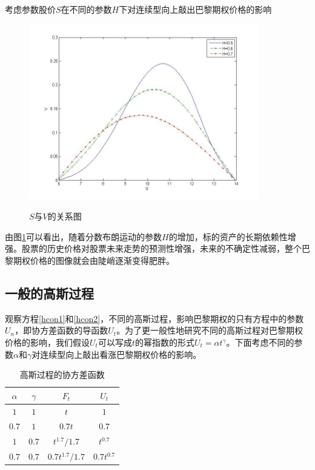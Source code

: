 \documentclass{ctexart} %
\begin{document}
考虑参数股价$S$在不同的参数$H$下对连续型向上敲出巴黎期权价格的影响
\begin{figure}[H]
\begin{center}
\label{paris_fbm}
\includegraphics[width=10cm]{code/paris_fbm.jpg}
\caption{$S$与$V$的关系图}
\end{center}
\end{figure}
由图\ref{paris_fbm}可以看出，随着分数布朗运动的参数$H$的增加，标的资产的长期依赖性增强。股票的历史价格对股票未来走势的预测性增强，未来的不确定性减弱，整个巴黎期权价格的图像就会由陡峭逐渐变得肥胖。
\fi

\subsection{一般的高斯过程}
观察方程\eqref{hcon1}和\eqref{hcon2}，不同的高斯过程，影响巴黎期权的只有方程中的参数$U_n$，即协方差函数的导函数$U_t$。为了更一般性地研究不同的高斯过程对巴黎期权价格的影响，我们假设$U_t$可以写成$t$的幂指数的形式$U_t=\alpha t^\gamma$。下面考虑不同的参数$\alpha$和$\gamma$对连续型向上敲出看涨巴黎期权价格的影响。
\begin{table}[htbp]
\centering
\caption{高斯过程的协方差函数}
\label{tabl2}
\begin{tabular}{c|c|c|c}
\hline
 $\alpha$&$\gamma$&$F_t$ & $U_t$ \\
\hline
$1$&$1$&$t$ & $1$ \\
$0.7$&$1$ & $0.7t$ & $0.7$ \\
$1$&$0.7$ & $t^{1.7}/1.7$ & $t^{0.7}$ \\
$0.7$&$0.7$&$0.7t^{1.7}/1.7$ & $0.7t^{0.7}$ \\
\hline
\end{tabular}
\end{table}
\end{document}
